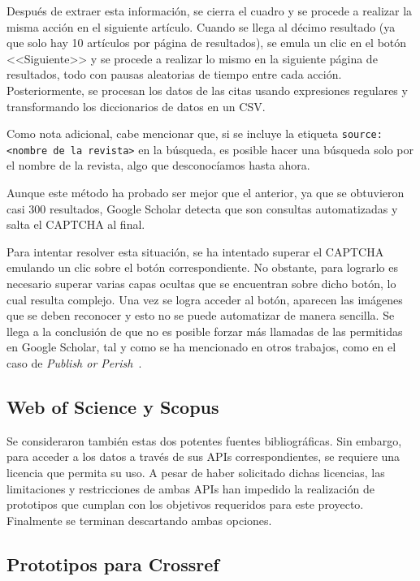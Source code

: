 Después de extraer esta información, se cierra el cuadro y se procede a realizar la misma acción en el siguiente artículo. Cuando se llega al décimo resultado (ya que solo hay 10 artículos por página de resultados), se emula un clic en el botón <<Siguiente>> y se procede a realizar lo mismo en la siguiente página de resultados, todo con pausas aleatorias de tiempo entre cada acción. Posteriormente, se procesan los datos de las citas usando expresiones regulares y transformando los diccionarios de datos en un CSV.

Como nota adicional, cabe mencionar que, si se incluye la etiqueta \texttt{source: <nombre de la revista>} en la búsqueda, es posible hacer una búsqueda solo por el nombre de la revista, algo que desconocíamos hasta ahora.

Aunque este método ha probado ser mejor que el anterior, ya que se obtuvieron casi 300 resultados, Google Scholar detecta que son consultas automatizadas y salta el CAPTCHA al final.

Para intentar resolver esta situación, se ha intentado superar el CAPTCHA emulando un clic sobre el botón correspondiente. No obstante, para lograrlo es necesario superar varias capas ocultas que se encuentran sobre dicho botón, lo cual resulta complejo. Una vez se logra acceder al botón, aparecen las imágenes que se deben reconocer y esto no se puede automatizar de manera sencilla. Se llega a la conclusión de que no es posible forzar más llamadas de las permitidas en Google Scholar, tal y como se ha mencionado en otros trabajos, como en el caso de \textit{Publish or Perish}~\cite{harzing2010}.

\subsection{Web of Science y Scopus}

Se consideraron también estas dos potentes fuentes bibliográficas. Sin embargo, para acceder a los datos a través de sus APIs correspondientes, se requiere una licencia que permita su uso. A pesar de haber solicitado dichas licencias, las limitaciones y restricciones de ambas APIs han impedido la realización de prototipos que cumplan con los objetivos requeridos para este proyecto. Finalmente se terminan descartando ambas opciones.

\subsection{Prototipos para Crossref}

